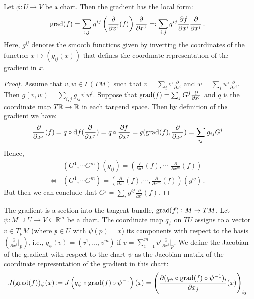 \begin{lemma}
	Let $\phi:U\to V$ be a chart. Then the gradient has the local form:
	\begin{align*}
		\mathrm{grad}(f) =\sum_{i,j}g^{ij}  \left( \frac{\partial }{\partial x^i} (f) \right) \frac{\partial }{\partial x^j} \eqcolon \sum_{i,j}g^{ij} \frac{\partial f}{\partial x^i}  \frac{\partial }{\partial x^j} \, .
	\end{align*}
	Here, $g^{ij}$ denotes the smooth functions given by inverting the coordinates of the function $x\mapsto (g_{ij}(x))$ that defines the coordinate representation of the gradient in $x$. 
\end{lemma}
\begin{proof} Assume that $v,w\in \Gamma( TM)$ such that $v=\sum_i v^i\frac{\partial	}{\partial x^i}$ and $w=\sum_i w^i\frac{\partial	}{\partial x^i}$. Then  $g(v,w)=\sum_{i,j} g_{ij} v^i w^i$.
	Suppose that $\mathrm{grad}(f)=\sum_j G^j \frac{\partial}{\partial x^j}$ and $q$ is the coordinate map $T\mathbb{R}\to \mathbb{R}$ in each tangend space. Then by definition of the gradient we have:
	\begin{align*}
		\frac{\partial }{\partial x^j}(f)=	q \circ \mathop{}\!\mathrm{d} f (\frac{\partial }{\partial x^j})=q\circ \frac{\partial f}{\partial x^j}= g(\mathrm{grad}(f),\frac{\partial }{\partial x^j})= \sum_{ij}g_{ij} G^i
	\end{align*} Hence, 
	\begin{align*}
		&(G^1,\cdots G^m)(g_{ij})=\left(\frac{\partial }{\partial x^1} (f),\cdots,\frac{\partial }{\partial x^m} (f)  \right) \\
		\Leftrightarrow &(G^1,\cdots G^m)=\left(\frac{\partial }{\partial x^1} (f),\cdots,\frac{\partial }{\partial x^m} (f)  \right) (g^{ij})\, .
	\end{align*}  But then we can conclude that $G^j=\sum_i g^{ij}\frac{\partial }{\partial x^i} (f)$.
	
\end{proof}

\begin{definition}
	The gradient is a section into the tangent bundle, $\mathrm{grad}(f):M\to TM$.
	Let $\psi: M\supseteq U\to V \subseteq \mathbb{R}^m$ be a chart. The coordinate map $q_{\psi}$ on $TU$ assigns to a vector $v \in T_pM$ (where $p \in U$ with $\psi(p) = x$) its components with respect to the basis $\left(\frac{\partial}{\partial x^i}\big|_p\right)$, i.e., $q_{\psi}(v) = (v^1, \ldots, v^m)$ if $v = \sum_{i=1}^m v^i \frac{\partial}{\partial x^i}\big|_p$.
	We define the Jacobian of the gradient with respect to the chart $\psi$ as the Jacobian matrix of the coordinate representation of the gradient in this chart:
	\[
	J(\mathrm{grad}(f))_\psi(x) \coloneq J\left(q_{\psi}\circ \mathrm{grad}(f)\circ \psi^{-1}\right)(x) = \left(\frac{\partial (q_{\psi}\circ \mathrm{grad}(f)\circ \psi^{-1})_i}{\partial x_j}(x)\right)_{ij}
	\]
\end{definition}

